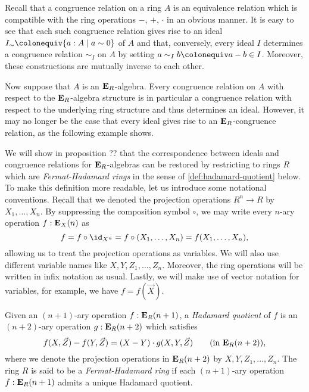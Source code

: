 {Recall that a congruence relation on a ring \(A\) is an equivalence relation which is compatible with the ring operations \(-\), \(+\), \(\cdot\) in an obvious manner.
It is easy to see that each such congruence relation gives rise to an ideal \(I_\sim\colonequiv \{a:A\mid a\sim 0\}\) of \(A\) and that, conversely, every ideal \(I\) determines a congruence relation \(\sim_I\) on \(A\) by setting \(a\sim_I b\colonequiv a-b\in I\).
Moreover, these constructions are mutually inverse to each other.

Now suppose that \(A\) is an \(\mathbf{E}_R\)-algebra.
Every congruence relation on \(A\) with respect to the \(\mathbf{E}_R\)-algebra structure is in particular a congruence relation with respect to the underlying ring structure and thus determines an ideal.
However, it may no longer be the case that every ideal gives rise to an \(\mathbf{E}_R\)-congruence relation, as the following example shows.

\begin{example}
\end{example}

We will show in proposition ?? that the correspondence between ideals and congruence relations for \(\mathbf{E}_R\)-algebras can be restored by restricting to rings \(R\) which are \emph{Fermat-Hadamard rings} in the sense of \cref{def:hadamard-quotient} below.
To make this definition more readable, let us introduce some notational conventions.
Recall that we denoted the projection operations \(R^n\to R\) by \(X_1,\dots, X_n\).
By suppressing the composition symbol \(\circ\), we may write every \(n\)-ary operation \(f:\mathbf{E}_X(n)\) as
\[
  f = f\circ\id_{X^n} = f \circ (X_1,\dots,X_n) = f(X_1,\dots,X_n),
\]
allowing us to treat the projection operations as variables.
We will also use different variable names like \(X,Y,Z_1,\dots,Z_n\).
Moreover, the ring operations will be written in infix notation as usual.
Lastly, we will make use of vector notation for variables, for example, we have \(f = f(\vec X)\).


\begin{definition}
  \label{def:hadamard-quotient}
  Given an \((n+1)\)-ary operation \(f:\mathbf{E}_R(n+1)\), a \emph{Hadamard quotient} of \(f\) is an \((n+2)\)-ary operation \(g : \mathbf{E}_R(n+2)\) which satisfies
  \[
    f(X,\vec Z) - f(Y,\vec Z) = (X-Y)\cdot g(X,Y,\vec Z) \qquad \text{(in \(\mathbf{E}_R(n+2)\))},
  \]
  where we denote the projection operations in \(\mathbf{E}_R(n+2)\) by \(X,Y,Z_1,\dots,Z_n\).
  The ring \(R\) is said to be a \emph{Fermat-Hadamard ring} if each \((n+1)\)-ary operation \(f:\mathbf{E}_R(n+1)\) admits a unique Hadamard quotient.
\end{definition}

}
